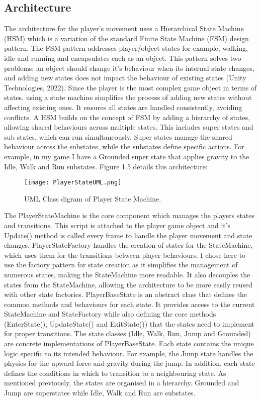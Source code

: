\documentclass[]{final_report}
\begin{document}
\subsection{Architecture}
The architecture for the player's movement uses a Hierarchical State Machine (HSM) which is a variation of the standard Finite State Machine (FSM) design pattern. The FSM pattern addresses player/object states for example, walking, idle and running and encapsulates each as an object. This pattern solves two problems: an object should change it’s behaviour when its internal state changes, and adding new states does not impact the behaviour of existing states (Unity Technologies, 2022). Since the player is the most complex game object in terms of states, using a state machine simplifies the process of adding new states without affecting existing ones.  It ensures all states are handled consistently, avoiding conflicts. A HSM builds on the concept of FSM by adding a hierarchy of states, allowing shared behaviours across multiple states. This includes super states and sub states, which can run simultaneously. Super states manage the shared behaviour across the substates, while the substates define specific actions. For example, in my game I have a Grounded super state that applies gravity to the Idle, Walk and Run substates. Figure 1.5 details this architecture:
\begin{figure}[h!]
    \centering
    \texttt{[image: PlayerStateUML.png]}
    \caption{UML Class digram of Player State Machine.}
    \label{fig:label_name}
\end{figure}
The PlayerStateMachine is the core component which manages the players states and transitions. This script is attached to the player game object and it's Update() method is called every frame to handle the player movement and state changes. PlayerStateFactory handles the creation of states for the StateMachine, which uses them for the transitions between player behaviours. I chose here to use the factory pattern for state creation as it simplifies the management of numerous states, making the StateMachine more readable. It also decouples the states from the StateMachine, allowing the architecture to be more easily reused with other state factories. PlayerBaseState is an abstract class that defines the common methods and behaviours for each state.  It provides access to the current StateMachine and StateFactory while also defining the core methods (EnterState(), UpdateState() and ExitState()) that the states need to implement for proper transitions. The state classes (Idle, Walk, Run, Jump and Grounded) are concrete implementations of PlayerBaseState. Each state contains the unique logic specific to its intended behaviour. For example, the Jump state handles the physics for the upward force and gravity during the jump. In addition, each state defines the conditions in which to transition to a neighbouring state. As mentioned previously, the states are organised in a hierarchy. Grounded and Jump are superstates while Idle, Walk and Run are substates. 
\end{document}
